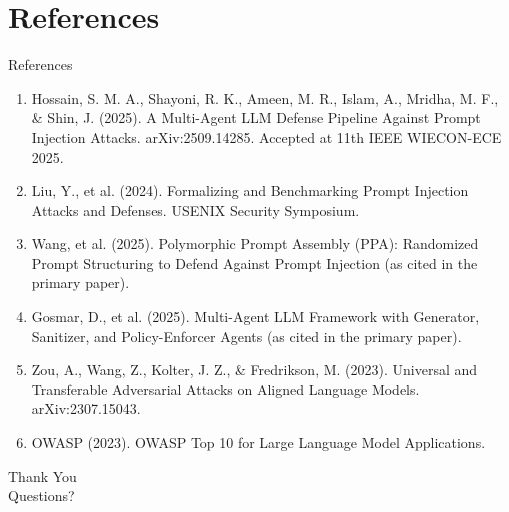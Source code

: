 \documentclass[10pt]{beamer}
\begin{document}
\section{References}
\begin{frame}[allowframebreaks]{References}
  \footnotesize
  \begin{enumerate}
    \item Hossain, S. M. A., Shayoni, R. K., Ameen, M. R., Islam, A., Mridha, M. F., \& Shin, J. (2025). A Multi-Agent LLM Defense Pipeline Against Prompt Injection Attacks. arXiv:2509.14285. Accepted at 11th IEEE WIECON-ECE 2025.
    \item Liu, Y., et al. (2024). Formalizing and Benchmarking Prompt Injection Attacks and Defenses. USENIX Security Symposium.
    \item Wang, et al. (2025). Polymorphic Prompt Assembly (PPA): Randomized Prompt Structuring to Defend Against Prompt Injection (as cited in the primary paper).
    \item Gosmar, D., et al. (2025). Multi-Agent LLM Framework with Generator, Sanitizer, and Policy-Enforcer Agents (as cited in the primary paper).
    \item Zou, A., Wang, Z., Kolter, J. Z., \& Fredrikson, M. (2023). Universal and Transferable Adversarial Attacks on Aligned Language Models. arXiv:2307.15043.
    \item OWASP (2023). OWASP Top 10 for Large Language Model Applications.
  \end{enumerate}
\end{frame}
\begin{frame}[plain]
  \begin{center}
    {\Huge Thank You}\\[1em]
    {\large Questions?}
  \end{center}
\end{frame}
\end{document}
